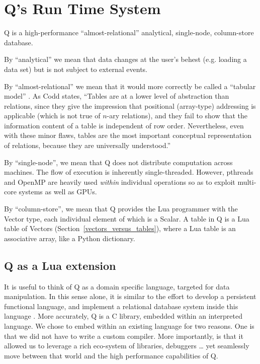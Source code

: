 \section{Q's Run Time System}

Q is a high-performance ``almost-relational'' 
analytical, single-node, column-store database. 
\be
\item 
By ``analytical'' we mean that data changes at the user's behest (e.g.
loading a data set) but is not subject to external events.
\item 
By ``almost-relational'' we mean that it would more correctly
be called a ``tabular model'' \cite{Codd1982}. As Codd states, ``Tables are
at a lower level of abstraction than relations, since they give
the impression that positional (array-type) addressing is applicable
(which is not true of \(n\)-ary relations), and they fail to
show that the information content of a table is independent
of row order. Nevertheless, even with these minor flaws,
tables are the most important conceptual representation of
relations, because they are universally understood.''
\item By ``single-node'', we mean that Q does not distribute computation across
  machines. The flow of execution is inherently single-threaded. However,
  pthreads and OpenMP are heavily used {\em within} individual operations so as
  to exploit multi-core systems as well as GPUs.
\item By ``column-store'', we mean that 
Q provides the Lua programmer with the Vector type, each
individual element of which is a Scalar. A table in Q is a Lua
table of Vectors (Section~\ref{vectors_versus_tables}), where a Lua table is an
associative array, like a Python dictionary.

\ee

\subsection{Q as a Lua extension}


It is useful to think of Q as a domain specific language, targeted for data
manipulation. In this sense alone, it is similar to the 
effort to develop a persistent functional language,
and implement a relational database system inside
this language  \cite{Wevers2014}.
More accurately, Q is a C library, embedded within an interpreted
language.
We chose to embed within an existing language for two reasons. One is that we did not have to
write a custom compiler. More importantly, is that it allowed us to leverage a rich eco-system of libraries, debuggers
\ldots
yet seamlessly move between that world and the high performance capabilities of
Q. 

